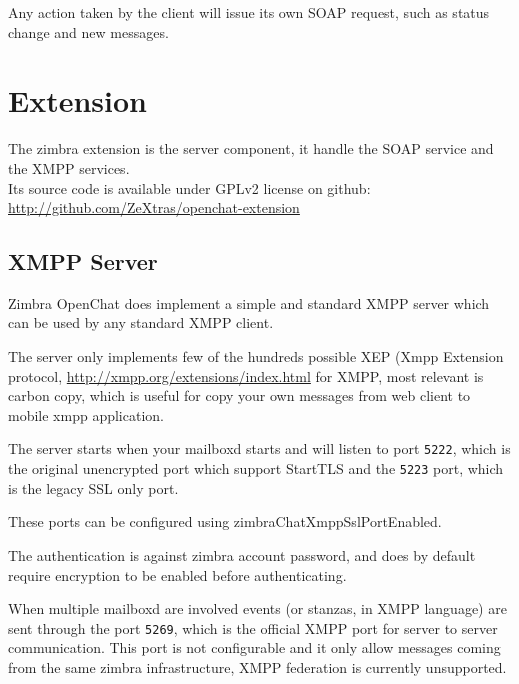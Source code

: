 Any action taken by the client will issue its own SOAP request, such as status change and new messages.
\fi

\section{Extension}
The zimbra extension is the server component, it handle the SOAP service and the XMPP services.\\
Its source code is available under GPLv2 license on github: \url{http://github.com/ZeXtras/openchat-extension}

\ifdefined\INTERNALDOC %
\subsection{XMPP Server}
Zimbra OpenChat does implement a simple and standard XMPP server which can be used by any standard XMPP client.

The server only implements few of the hundreds possible XEP (Xmpp Extension protocol, \url{http://xmpp.org/extensions/index.html} for XMPP,
 most relevant is carbon copy, which is useful for copy your own messages from web client to mobile xmpp application.

The server starts when your mailboxd starts and will listen to port \verb+5222+, which is the original unencrypted port
 which support StartTLS and the \verb+5223+ port, which is the legacy SSL only port.

These ports can be configured using zimbraChatXmppSslPortEnabled. %

The authentication is against zimbra account password, and does by default require encryption to be enabled before authenticating.

When multiple mailboxd are involved events (or stanzas, in XMPP language) are sent through the port \verb+5269+,
 which is the official XMPP port for server to server communication.
 This port is not configurable and it only allow messages coming from the same zimbra infrastructure, XMPP federation is currently unsupported.
\fi
